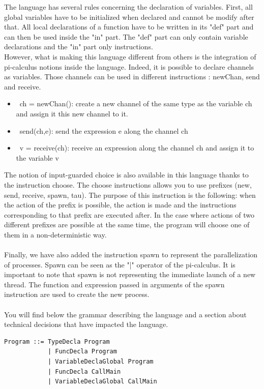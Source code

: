 \documentclass[11pt]{report}
\begin{document}
\tabto{1cm}The language has several rules concerning the declaration of variables. First, all global variables have to be initialized when declared and cannot be modify after that. All local declarations of a function have to be written in its "def" part and can then be used inside the "in" part. The "def" part can only contain variable declarations and the "in" part only instructions. \\

\tabto{1cm}However, what is making this language different from others is the integration of pi-calculus notions inside the language. Indeed, it is possible to declare channels as variables. Those channels can be used in different instructions : newChan, send and receive.
\begin{itemize}
\item \ ch = newChan(): create a new channel of the same type as the variable ch and assign it this new channel to it.
\item \ send(ch,e): send the expression e along the channel ch
\item \ v = receive(ch): receive an expression along the channel ch and assign it to the variable v
\end{itemize}

\tabto{1cm}The notion of input-guarded choice is also available in this language thanks to the instruction choose. The choose instructions allows you to use prefixes (new, send, receive, spawn, tau). The purpose of this instruction is the following: when the action of the prefix is possible, the action is made and the instructions corresponding to that prefix are executed after. In the case where actions of two different prefixes are possible at the same time, the program will choose one of them in a non-deterministic way.
\\ \\
\tabto{1cm} Finally, we have also added the instruction spawn to represent the parallelization of processes. Spawn can be seen as the "|" operator of the pi-calculus. It is important to note that spawn is not representing the immediate launch of a new thread. The function and expression passed in arguments of the spawn instruction are used to create the new process.
\\ \\
\tabto{1cm} You will find below the grammar describing the language and a section about technical decisions that have impacted the language.

\newpage
{}
{} 
\vspace*{20 pt}
\vspace*{3pt}
\begin{Verbatim}[fontfamily=textsf]
Program ::= TypeDecla Program
            | FuncDecla Program
            | VariableDeclaGlobal Program
            | FuncDecla CallMain
            | VariableDeclaGlobal CallMain
\end{Verbatim}
\vspace*{3pt}
\end{document}
